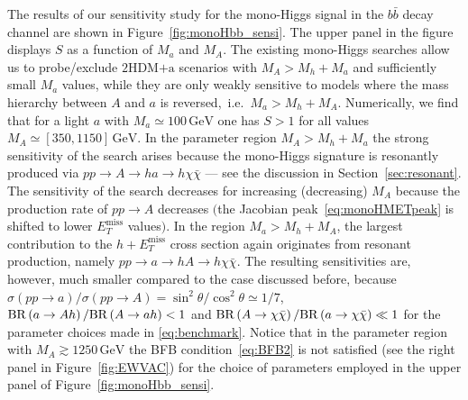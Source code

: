 \documentclass[review]{elsarticle}
\newcommand{\MET}{\ensuremath{E_T^\mathrm{miss}}\xspace}
\newcommand{\mA}{\ensuremath{M_{A}}\xspace}
\newcommand{\ma}{\ensuremath{M_{a}}\xspace}
\newcommand{\hdma}{\ensuremath{\textrm{2HDM+a}}\xspace}
\begin{document}
The results of our sensitivity study for the mono-Higgs signal in the $b \bar b$ decay channel are shown in Figure~\ref{fig:monoHbb_sensi}. The upper panel in the figure displays $S$  as a function of $\ma$ and $\mA$. The existing mono-Higgs searches allow us to probe/exclude \hdma scenarios with  $\mA > M_h + \ma$  and sufficiently small $\ma$ values, while they are only weakly  sensitive to models where the mass hierarchy between $A$ and $a$ is reversed,~i.e.~$\ma > M_h + \mA$. Numerically, we find that  for  a light $a$ with $\ma \simeq 100 \, {\mathrm{GeV}}$ one has $S > 1$ for all values $\mA \simeq [350, 1150] \, {\mathrm{GeV}}$. In the parameter region  $\mA > M_h + \ma$ the strong sensitivity of the search arises because the mono-Higgs signature is resonantly produced via $pp \to A \to ha \to h \chi \bar \chi$ --- see the discussion in Section~\ref{sec:resonant}. The sensitivity of the search decreases for increasing (decreasing) $M_A$ because the production rate of $pp \to A$  decreases $\big($the Jacobian peak~\eqref{eq:monoHMETpeak} is shifted to lower $\MET$ values$\big)$. In the region $\ma > M_h + \mA$, the largest contribution to the $h + \MET$ cross section again originates from resonant production, namely $pp \to a \to hA \to h \chi \bar \chi$.  The resulting sensitivities are, however, much smaller compared to the case discussed before, because  $\sigma \left (p p \to a \right )/\sigma \left (pp \to A \right ) = \sin^2 \theta/\cos^2 \theta \simeq 1/7$, ${\rm BR} \left ( a \to A h \right )/{\rm BR} \left (  A \to a h  \right ) < 1$ and ${\rm BR} \left ( A \to \chi \bar \chi \right )/{\rm BR} \left (  a \to \chi \bar \chi \right ) \ll~\!\!1$ for the parameter choices made in \eqref{eq:benchmark}. Notice that in the parameter region with $M_A \gtrsim 1250 \, {\mathrm{GeV}}$ the BFB condition~\eqref{eq:BFB2} is not satisfied (see the right panel in Figure~\ref{fig:EWVAC}) for the choice of parameters employed in the upper panel of Figure~\ref{fig:monoHbb_sensi}.
\end{document}
